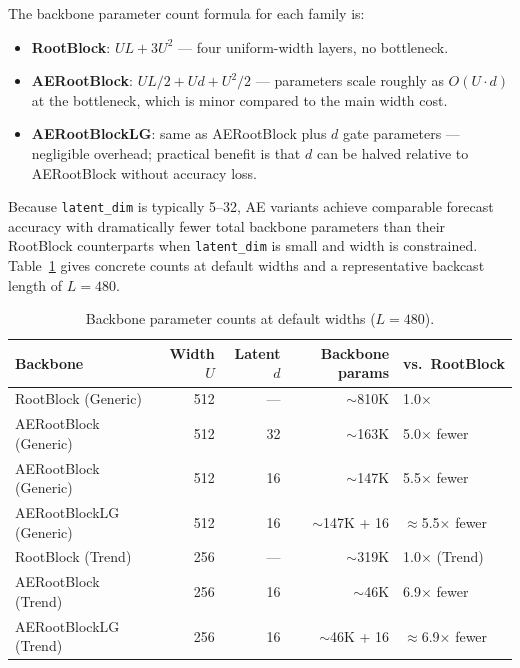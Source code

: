 \documentclass[11pt,a4paper]{article}
\begin{document}
The backbone parameter count formula for each family is:
\begin{itemize}
\item \textbf{RootBlock}: $UL + 3U^2$ --- four uniform-width layers, no bottleneck.
\item \textbf{AERootBlock}: $UL/2 + Ud + U^2/2$ --- parameters scale roughly as $O(U \cdot d)$ at the bottleneck, which is minor compared to the main width cost.
\item \textbf{AERootBlockLG}: same as AERootBlock plus $d$ gate parameters --- negligible overhead; practical benefit is that $d$ can be halved relative to AERootBlock without accuracy loss.
\end{itemize}

Because \texttt{latent\_dim} is typically 5--32, AE variants achieve comparable forecast accuracy with dramatically fewer total backbone parameters than their RootBlock counterparts when \texttt{latent\_dim} is small and width is constrained. Table~\ref{tab:param-counts} gives concrete counts at default widths and a representative backcast length of $L = 480$.

\begin{table}
  \caption{Backbone parameter counts at default widths ($L = 480$).}
  \label{tab:param-counts}
  \centering
  \begin{tabular}{lrrrl}
    \toprule
    Backbone & Width $U$ & Latent $d$ & Backbone params & vs.\ RootBlock \\
    \midrule
    RootBlock (Generic)     & 512 & ---  & $\sim$810K          & 1.0$\times$ \\
    AERootBlock (Generic)   & 512 & 32   & $\sim$163K          & 5.0$\times$ fewer \\
    AERootBlock (Generic)   & 512 & 16   & $\sim$147K          & 5.5$\times$ fewer \\
    AERootBlockLG (Generic) & 512 & 16   & $\sim$147K + 16     & $\approx$5.5$\times$ fewer \\
    RootBlock (Trend)       & 256 & ---  & $\sim$319K          & 1.0$\times$ (Trend) \\
    AERootBlock (Trend)     & 256 & 16   & $\sim$46K           & 6.9$\times$ fewer \\
    AERootBlockLG (Trend)   & 256 & 16   & $\sim$46K + 16      & $\approx$6.9$\times$ fewer \\
    \bottomrule
  \end{tabular}
\end{table}
\end{document}
